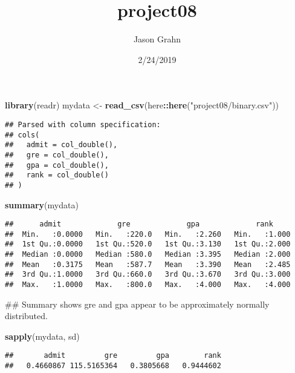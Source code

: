 \documentclass[]{article}
\title{project08}
\author{Jason Grahn}
\date{2/24/2019}
\newenvironment{Shaded}{\begin{snugshade}}{\end{snugshade}}
\newcommand{\KeywordTok}[1]{\textcolor[rgb]{0.13,0.29,0.53}{\textbf{#1}}}
\newcommand{\StringTok}[1]{\textcolor[rgb]{0.31,0.60,0.02}{#1}}
\newcommand{\OperatorTok}[1]{\textcolor[rgb]{0.81,0.36,0.00}{\textbf{#1}}}
\newcommand{\NormalTok}[1]{#1}
\begin{document}
\maketitle

\begin{Shaded}
\begin{Highlighting}[]
\KeywordTok{library}\NormalTok{(readr)}
\NormalTok{mydata <-}\StringTok{ }\KeywordTok{read_csv}\NormalTok{(here}\OperatorTok{::}\KeywordTok{here}\NormalTok{(}\StringTok{"project08/binary.csv"}\NormalTok{))}
\end{Highlighting}
\end{Shaded}

\begin{verbatim}
## Parsed with column specification:
## cols(
##   admit = col_double(),
##   gre = col_double(),
##   gpa = col_double(),
##   rank = col_double()
## )
\end{verbatim}

\begin{Shaded}
\begin{Highlighting}[]
\KeywordTok{summary}\NormalTok{(mydata) }
\end{Highlighting}
\end{Shaded}

\begin{verbatim}
##      admit             gre             gpa             rank      
##  Min.   :0.0000   Min.   :220.0   Min.   :2.260   Min.   :1.000  
##  1st Qu.:0.0000   1st Qu.:520.0   1st Qu.:3.130   1st Qu.:2.000  
##  Median :0.0000   Median :580.0   Median :3.395   Median :2.000  
##  Mean   :0.3175   Mean   :587.7   Mean   :3.390   Mean   :2.485  
##  3rd Qu.:1.0000   3rd Qu.:660.0   3rd Qu.:3.670   3rd Qu.:3.000  
##  Max.   :1.0000   Max.   :800.0   Max.   :4.000   Max.   :4.000
\end{verbatim}

\begin{Shaded}
\begin{Highlighting}[]
\NormalTok{## Summary shows gre and gpa appear to be approximately normally distributed.}

\KeywordTok{sapply}\NormalTok{(mydata, sd) }
\end{Highlighting}
\end{Shaded}

\begin{verbatim}
##       admit         gre         gpa        rank 
##   0.4660867 115.5165364   0.3805668   0.9444602
\end{verbatim}
\end{document}
